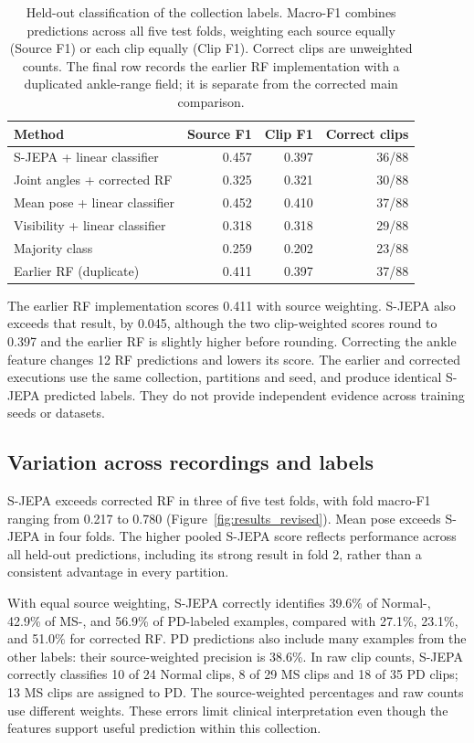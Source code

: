 \documentclass[10pt,twocolumn,letterpaper]{article}
\begin{document}
\begin{table}[t]
\centering
\small
\setlength{\tabcolsep}{3pt}
\begin{tabular}{@{}p{}rrr@{}}
\hline
Method & Source F1 & Clip F1 & Correct clips \\
\hline
S-JEPA + linear classifier & 0.457 & 0.397 & 36/88 \\
Joint angles + corrected RF & 0.325 & 0.321 & 30/88 \\
Mean pose + linear classifier & 0.452 & 0.410 & 37/88 \\
Visibility + linear classifier & 0.318 & 0.318 & 29/88 \\
Majority class & 0.259 & 0.202 & 23/88 \\
\hline
Earlier RF (duplicate) & 0.411 & 0.397 & 37/88 \\
\hline
\end{tabular}
\caption{Held-out classification of the collection labels. Macro-F1 combines predictions across all five test folds, weighting each source equally (Source F1) or each clip equally (Clip F1). Correct clips are unweighted counts. The final row records the earlier RF implementation with a duplicated ankle-range field; it is separate from the corrected main comparison.}
\label{tab:heldout_revised}
\end{table}

The earlier RF implementation scores 0.411 with source weighting. S-JEPA also exceeds that result, by 0.045, although the two clip-weighted scores round to 0.397 and the earlier RF is slightly higher before rounding. Correcting the ankle feature changes 12 RF predictions and lowers its score. The earlier and corrected executions use the same collection, partitions and seed, and produce identical S-JEPA predicted labels. They do not provide independent evidence across training seeds or datasets.

\subsection{Variation across recordings and labels}
S-JEPA exceeds corrected RF in three of five test folds, with fold macro-F1 ranging from 0.217 to 0.780 (Figure~\ref{fig:results_revised}). Mean pose exceeds S-JEPA in four folds. The higher pooled S-JEPA score reflects performance across all held-out predictions, including its strong result in fold 2, rather than a consistent advantage in every partition.

With equal source weighting, S-JEPA correctly identifies 39.6\% of Normal-, 42.9\% of MS-, and 56.9\% of PD-labeled examples, compared with 27.1\%, 23.1\%, and 51.0\% for corrected RF. PD predictions also include many examples from the other labels: their source-weighted precision is 38.6\%. In raw clip counts, S-JEPA correctly classifies 10 of 24 Normal clips, 8 of 29 MS clips and 18 of 35 PD clips; 13 MS clips are assigned to PD. The source-weighted percentages and raw counts use different weights. These errors limit clinical interpretation even though the features support useful prediction within this collection.
\end{document}
